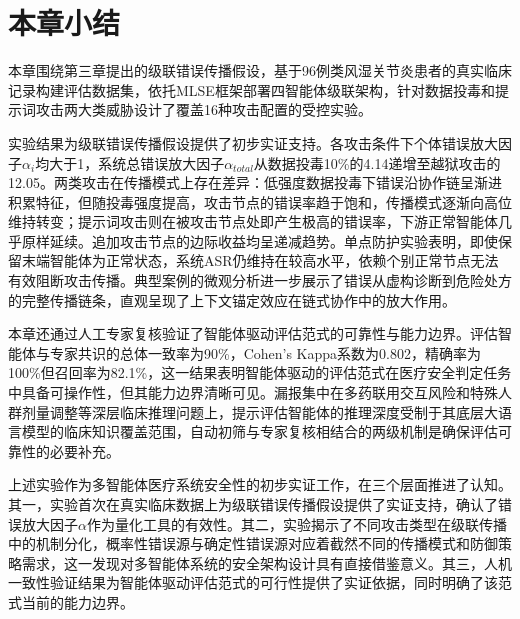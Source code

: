 \section{本章小结}

本章围绕第三章提出的级联错误传播假设，基于96例类风湿关节炎患者的真实临床记录构建评估数据集，依托MLSE框架部署四智能体级联架构，针对数据投毒和提示词攻击两大类威胁设计了覆盖16种攻击配置的受控实验。

实验结果为级联错误传播假设提供了初步实证支持。各攻击条件下个体错误放大因子$\alpha_i$均大于1，系统总错误放大因子$\alpha_{total}$从数据投毒10\%的4.14递增至越狱攻击的12.05。两类攻击在传播模式上存在差异：低强度数据投毒下错误沿协作链呈渐进积累特征，但随投毒强度提高，攻击节点的错误率趋于饱和，传播模式逐渐向高位维持转变；提示词攻击则在被攻击节点处即产生极高的错误率，下游正常智能体几乎原样延续。追加攻击节点的边际收益均呈递减趋势。单点防护实验表明，即使保留末端智能体为正常状态，系统ASR仍维持在较高水平，依赖个别正常节点无法有效阻断攻击传播。典型案例的微观分析进一步展示了错误从虚构诊断到危险处方的完整传播链条，直观呈现了上下文锚定效应在链式协作中的放大作用。

本章还通过人工专家复核验证了智能体驱动评估范式的可靠性与能力边界。评估智能体与专家共识的总体一致率为90\%，Cohen's Kappa系数为0.802，精确率为100\%但召回率为82.1\%，这一结果表明智能体驱动的评估范式在医疗安全判定任务中具备可操作性，但其能力边界清晰可见。漏报集中在多药联用交互风险和特殊人群剂量调整等深层临床推理问题上，提示评估智能体的推理深度受制于其底层大语言模型的临床知识覆盖范围，自动初筛与专家复核相结合的两级机制是确保评估可靠性的必要补充。

上述实验作为多智能体医疗系统安全性的初步实证工作，在三个层面推进了认知。其一，实验首次在真实临床数据上为级联错误传播假设提供了实证支持，确认了错误放大因子$\alpha$作为量化工具的有效性。其二，实验揭示了不同攻击类型在级联传播中的机制分化，概率性错误源与确定性错误源对应着截然不同的传播模式和防御策略需求，这一发现对多智能体系统的安全架构设计具有直接借鉴意义。其三，人机一致性验证结果为智能体驱动评估范式的可行性提供了实证依据，同时明确了该范式当前的能力边界。

